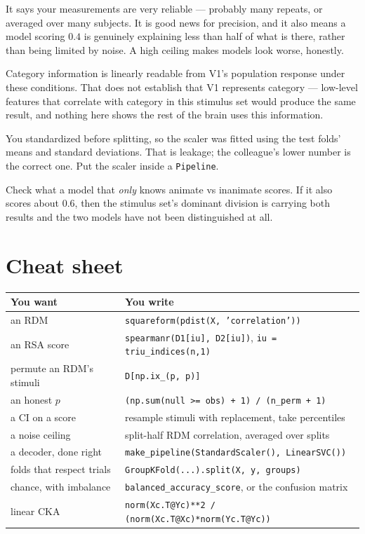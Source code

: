 \documentclass[11pt]{article}
\begin{document}
 It says your measurements are very reliable --- probably many repeats,
or averaged over many subjects. It is good news for precision, and it also
means a model scoring $0.4$ is genuinely explaining less than half of what is
there, rather than being limited by noise. A high ceiling makes models look
worse, honestly.

 Category information is linearly readable from V1's population response
under these conditions. That does not establish that V1 represents category ---
low-level features that correlate with category in this stimulus set would
produce the same result, and nothing here shows the rest of the brain uses this
information.

 You standardized before splitting, so the scaler was fitted using the
test folds' means and standard deviations. That is leakage; the colleague's
lower number is the correct one. Put the scaler inside a \texttt{Pipeline}.

 Check what a model that \emph{only} knows animate vs inanimate scores.
If it also scores about $0.6$, then the stimulus set's dominant division is
carrying both results and the two models have not been distinguished at all.

\section*{Cheat sheet}

\begin{center}
\begin{tabular}{@{}p{}p{}@{}}
\toprule
\textbf{You want} & \textbf{You write} \\
\midrule
an RDM                        & \texttt{squareform(pdist(X, 'correlation'))} \\
an RSA score                  & \texttt{spearmanr(D1[iu], D2[iu])}, \texttt{iu = triu\_indices(n,1)} \\
permute an RDM's stimuli      & \texttt{D[np.ix\_(p, p)]} \\
an honest $p$                 & \texttt{(np.sum(null >= obs) + 1) / (n\_perm + 1)} \\
a CI on a score               & resample stimuli with replacement, take percentiles \\
a noise ceiling               & split-half RDM correlation, averaged over splits \\
a decoder, done right         & \texttt{make\_pipeline(StandardScaler(), LinearSVC())} \\
folds that respect trials     & \texttt{GroupKFold(...).split(X, y, groups)} \\
chance, with imbalance        & \texttt{balanced\_accuracy\_score}, or the confusion matrix \\
linear CKA                    & \texttt{norm(Xc.T@Yc)**2 / (norm(Xc.T@Xc)*norm(Yc.T@Yc))} \\
\bottomrule
\end{tabular}
\end{center}
\end{document}
